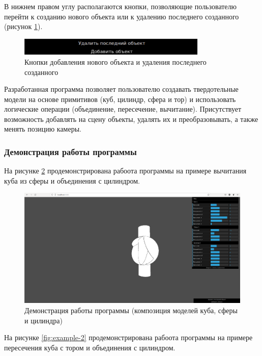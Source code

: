 В нижнем правом углу располагаются кнопки, позволяющие пользователю перейти к созданию нового объекта или к удалению последнего созданного (рисунок \ref{fig:add-buttons}).
\begin{figure}[h]
	\centering
	\captionsetup{justification=centering}
	\includegraphics[width=90mm]{img/add-buttons.png}
	\caption{Кнопки добавления нового объекта и удаления последнего созданного}
	\label{fig:add-buttons}
\end{figure}

Разработанная программа позволяет пользователю создавать твердотельные модели на основе примитивов (куб, цилиндр, сфера и тор) и использовать логические операции (объединение, пересечение, вычитание). Присутствует возможность добавлять на сцену объекты, удалять их и преобразовывать, а также менять позицию камеры.

\subsubsection{Демонстрация работы программы}

На рисунке \ref{fig:example-1} продемонстрирована рабоота программы на примере вычитания куба из сферы и объединения с цилиндром.

\begin{figure}[h]
	\centering
	\captionsetup{justification=centering}
	\includegraphics[width=140mm]{img/example-1.png}
	\caption{Демонстрация  работы  программы  (композиция  моделей 
		куба, сферы и цилиндра)}
	\label{fig:example-1}
\end{figure}

На рисунке \ref{fig:example-2} продемонстрирована рабоота программы на примере пересечения куба с тором и объединения с цилиндром.

